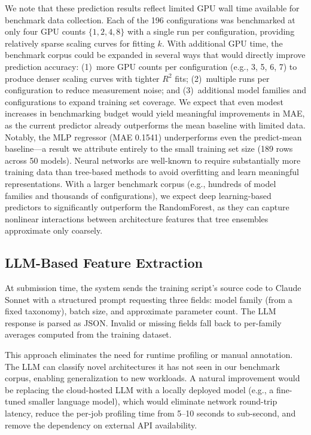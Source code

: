 \documentclass[letterpaper,10pt]{article}
\begin{document}
We note that these prediction results reflect limited GPU wall time available for benchmark data collection. Each of the 196 configurations was benchmarked at only four GPU counts $\{1, 2, 4, 8\}$ with a single run per configuration, providing relatively sparse scaling curves for fitting $k$. With additional GPU time, the benchmark corpus could be expanded in several ways that would directly improve prediction accuracy: (1)~more GPU counts per configuration (e.g., 3, 5, 6, 7) to produce denser scaling curves with tighter $R^2$ fits; (2)~multiple runs per configuration to reduce measurement noise; and (3)~additional model families and configurations to expand training set coverage. We expect that even modest increases in benchmarking budget would yield meaningful improvements in MAE, as the current predictor already outperforms the mean baseline with limited data. Notably, the MLP regressor (MAE 0.1541) underperforms even the predict-mean baseline---a result we attribute entirely to the small training set size (189 rows across 50 models). Neural networks are well-known to require substantially more training data than tree-based methods to avoid overfitting and learn meaningful representations. With a larger benchmark corpus (e.g., hundreds of model families and thousands of configurations), we expect deep learning-based predictors to significantly outperform the RandomForest, as they can capture nonlinear interactions between architecture features that tree ensembles approximate only coarsely.

\subsection{LLM-Based Feature Extraction}

At submission time, the system sends the training script's source code to Claude Sonnet with a structured prompt requesting three fields: model family (from a fixed taxonomy), batch size, and approximate parameter count. The LLM response is parsed as JSON. Invalid or missing fields fall back to per-family averages computed from the training dataset.

This approach eliminates the need for runtime profiling or manual annotation. The LLM can classify novel architectures it has not seen in our benchmark corpus, enabling generalization to new workloads. A natural improvement would be replacing the cloud-hosted LLM with a locally deployed model (e.g., a fine-tuned smaller language model), which would eliminate network round-trip latency, reduce the per-job profiling time from 5--10 seconds to sub-second, and remove the dependency on external API availability.
\end{document}
